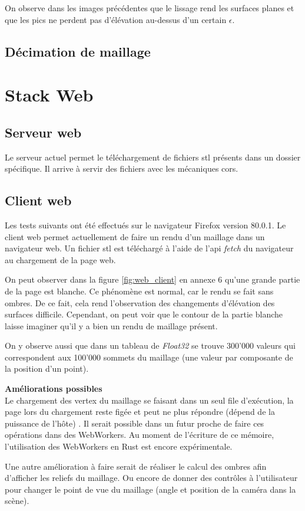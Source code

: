 On observe dans les images précédentes que le lissage rend les surfaces planes et que les pics ne perdent pas d'élévation au-dessus d'un certain $\epsilon$.

\subsection{Décimation de maillage}

\section{Stack Web}
\subsection{Serveur web}

Le serveur actuel permet le téléchargement de fichiers \gls{stl} présents dans
un dossier spécifique. Il arrive à servir des fichiers avec les mécaniques \gls{cors}.

\subsection{Client web}
Les tests suivants ont été effectués sur le navigateur Firefox version 80.0.1.
Le client web permet actuellement de faire un rendu d'un maillage dans un
navigateur web. Un fichier \gls{stl} est téléchargé à l'aide de l'api
\textit{fetch} du navigateur au chargement de la page web.

On peut observer dans la figure \ref{fig:web_client} en annexe 6 qu'une grande partie de la page est blanche.
Ce phénomène est normal, car le rendu se fait sans ombres.
De ce fait, cela rend l'observation des changements d'élévation des surfaces difficile.
Cependant, on peut voir que le contour de la partie blanche laisse imaginer qu'il y a bien un rendu de maillage présent.

On y observe aussi que dans un tableau de \textit{Float32} se trouve 300'000 valeurs qui correspondent aux 100'000 sommets du maillage (une valeur par composante de la position d'un point).

\textbf{Améliorations possibles} \\
Le chargement des vertex du maillage se faisant dans un seul file d'exécution,
la page lors du chargement reste figée et peut ne plus répondre (dépend de la
puissance de l'hôte) .
Il serait possible dans un futur proche de faire ces opérations dans des WebWorkers. Au
moment de l'écriture de ce mémoire, l'utilisation des WebWorkers
en Rust est encore expérimentale.

Une autre amélioration à faire serait de réaliser le calcul des ombres afin d'afficher les reliefs du maillage.
Ou encore de donner des contrôles à l'utilisateur pour changer le point 
de vue du maillage (angle et position de la caméra dans la scène).
